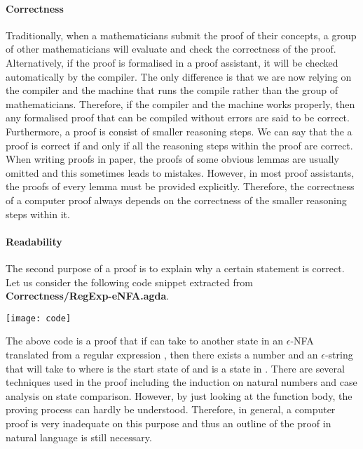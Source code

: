 \paragraph{Correctness} Traditionally, when a mathematicians submit
the proof of their concepts, a group of other mathematicians will
evaluate and check the correctness of the proof. Alternatively, if the
proof is formalised in a proof assistant, it will be checked 
automatically by the compiler. The only difference is that we are now
relying on the compiler and the machine that runs the compile rather
than the group of mathematicians. Therefore, if the compiler and the
machine works properly, then any formalised proof that
can be compiled without errors are said to be correct. Furthermore, a
proof is consist of smaller reasoning steps. We can say that the a proof is correct if and only if all the
reasoning steps within the proof are correct. When writing proofs in paper, the proofs of
some obvious lemmas are usually omitted and this sometimes leads to mistakes. However, in
most proof assistants, the proofs of every lemma must be provided explicitly. Therefore, the correctness of
a computer proof always depends on the correctness of the smaller reasoning steps within it. 

\paragraph{Readability} The second purpose of a proof is to explain why
a certain statement is correct. Let us consider the following code
snippet extracted from \textbf{Correctness/RegExp-eNFA.agda}. 
\begin{center} \texttt{[image: code]} \end{center}

\par The above code is a proof that if  can take  to
another state  in an \(\epsilon\)-NFA translated from a
regular expression , then there exists a number  and
an \(\epsilon\)-string  that will take  to  where
 is the start state of  and  is a state in
. There are several techniques used in the proof including the 
induction on natural numbers and case analysis on state comparison. However, by
just looking at the function body, the proving process can hardly be
understood. Therefore, in general, a computer proof is very inadequate on
this purpose and thus an outline of the proof in natural language is
still necessary. 

